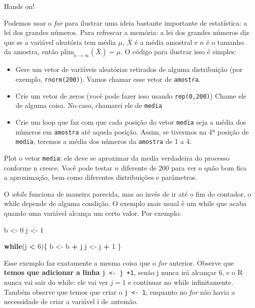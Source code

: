 \documentclass[]{book}
\newenvironment{Shaded}{\begin{snugshade}}{\end{snugshade}}
\newcommand{\DecValTok}[1]{\textcolor[rgb]{0.00,0.00,0.81}{#1}}
\newcommand{\StringTok}[1]{\textcolor[rgb]{0.31,0.60,0.02}{#1}}
\newcommand{\ControlFlowTok}[1]{\textcolor[rgb]{0.13,0.29,0.53}{\textbf{#1}}}
\newcommand{\OperatorTok}[1]{\textcolor[rgb]{0.81,0.36,0.00}{\textbf{#1}}}
\newcommand{\NormalTok}[1]{#1}
\providecommand{\tightlist}{%
  \setlength{\itemsep}{0pt}\setlength{\parskip}{0pt}}
\begin{document}
Hands on!

Podemos usar o \emph{for} para ilustrar uma ideia bastante importante de
estatística: a lei dos grandes números. Para refrescar a memória: a lei
dos grandes números diz que se a variável aleatória tem média \(\mu\),
\(\bar{X}\) é a média amostral e \(n\) é o tamanho da amostra, então
\(\text{plim}_{n \rightarrow \infty}(\bar{X}) = \mu\). O código para
ilustrar isso é simples:

\begin{itemize}
\tightlist
\item
  Gere um vetor de variáveis aleatórias retirados de alguma distribuição
  (por exemplo, \texttt{rnorm(200)}). Vamos chamar esse vetor de
  \texttt{amostra}.
\item
  Crie um vetor de zeros (você pode fazer isso usando
  \texttt{rep(0,200)}) Chame ele de alguma coisa. No caso, chamarei ele
  de \texttt{media}
\item
  Crie um loop que faz com que cada posição do vetor \texttt{media} seja
  a média dos números em \texttt{amostra} até aquela posição. Assim, se
  tivermos na 4ª posição de \texttt{media}, teremos a média dos números
  da \texttt{amostra} de 1 a 4.
\end{itemize}

Plot o vetor \texttt{media}: ele deve se aproximar da media verdadeira
do processo conforme n cresce. Você pode testar \(n\) diferente de 200
para ver o quão bom fica a aproximação, bem como diferentes
distribuições e parâmetros.

O \emph{while} funciona de maneira parecida, mas ao invés de ir até o
fim do contador, o while depende de alguma condição. O exemplo mais
usual é um while que acaba quando uma variável alcança um certo valor.
Por exemplo:

\begin{Shaded}
\begin{Highlighting}[]
\NormalTok{b <-}\StringTok{ }\DecValTok{0}
\NormalTok{j <-}\StringTok{ }\DecValTok{1}

\ControlFlowTok{while}\NormalTok{(j }\OperatorTok{<}\StringTok{ }\DecValTok{6}\NormalTok{)\{}
\NormalTok{b <-}\StringTok{ }\NormalTok{b }\OperatorTok{+}\StringTok{ }\NormalTok{j}
\NormalTok{j <-}\StringTok{ }\NormalTok{j }\OperatorTok{+}\StringTok{ }\DecValTok{1}
\NormalTok{\}}
\end{Highlighting}
\end{Shaded}

Esse exemplo faz exatamente a mesma coisa que o \emph{for} anterior.
Observe que \textbf{temos que adicionar a linha}
\texttt{j\ \textless{}-\ j\ +1}, senão j nunca irá alcançar 6, e o R
nunca vai sair do while: ele vai ver \(j = 1\) e continuar no while
infinitamente. Também observe que temos que criar o
\texttt{j\ \textless{}-\ 1}, enquanto no \emph{for} não havia a
necessidade de criar a variável i de antemão.
\end{document}
